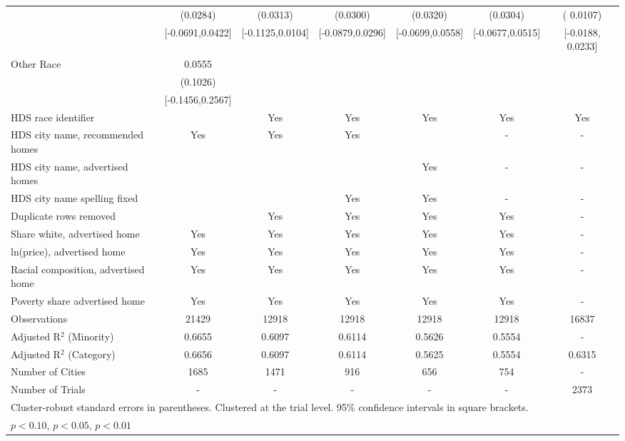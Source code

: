 \begin{table}[htbp]
{\begin{tabular}{l*{6}{c}}
 & (0.0284) & (0.0313) & (0.0300) & (0.0320) & (0.0304) & ( 0.0107) \\
 & [-0.0691,0.0422] & [-0.1125,0.0104] & [-0.0879,0.0296] & [-0.0699,0.0558] & [-0.0677,0.0515] & [-0.0188,  0.0233] \\
Other Race & 0.0555 &  &  &  &  &  \\
 & (0.1026) &  &  &  &  &  \\
 & [-0.1456,0.2567] &  &  &  &  &  \\
\midrule
HDS race identifier & & Yes & Yes & Yes & Yes & Yes \\
HDS city name, recommended homes & Yes & Yes & Yes & & - & -\\
HDS city name, advertised homes &  &  &  & Yes & - & -\\
HDS city name spelling fixed & & & Yes & Yes & - & -\\
Duplicate rows removed &  & Yes & Yes & Yes & Yes & - \\
\midrule
Share white, advertised home  & Yes & Yes & Yes & Yes & Yes & - \\
ln(price), advertised home  & Yes & Yes & Yes & Yes & Yes & - \\
Racial composition, advertised home & Yes & Yes & Yes & Yes & Yes & - \\
Poverty share advertised home & Yes & Yes & Yes & Yes & Yes & - \\
Observations & 21429 & 12918 & 12918 & 12918 & 12918 & 16837 \\
Adjusted R$^2$ (Minority) & 0.6655 & 0.6097 & 0.6114 & 0.5626 & 0.5554 & - \\
Adjusted R$^2$ (Category) & 0.6656 & 0.6097 & 0.6114 & 0.5625 & 0.5554 & 0.6315 \\
Number of Cities & 1685 & 1471 & 916 & 656 & 754 & - \\
Number of Trials & - & - & - & - & - & 2373 \\
\bottomrule
\multicolumn{7}{l}{\footnotesize Cluster-robust standard errors in parentheses. Clustered at the trial level. 95\% confidence intervals in square brackets.}\\
\multicolumn{7}{l}{\footnotesize \sym{*} \(p<0.10\), \sym{**} \(p<0.05\), \sym{***} \(p<0.01\)}\\
\end{tabular}
}
\end{table}
